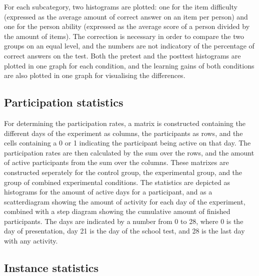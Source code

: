 For each subcategory, two histograms are plotted: one for the item difficulty (expressed as the average amount of correct answer on an item per person) and one for the person ability (expressed as the average score of a person divided by the amount of items). The correction is necessary in order to compare the two groups on an equal level, and the numbers are not indicatory of the percentage of correct answers on the test. Both the pretest and the posttest histograms are plotted in one graph for each condition, and the learning gains of both conditions are also plotted in one graph for visualising the differences.

\subsection{Participation statistics}

For determining the participation rates, a matrix is constructed containing the different days of the experiment as columns, the participants as rows, and the cells containing a 0 or 1 indicating the participant being active on that day. The participation rates are then calculated by the sum over the rows, and the amount of active participants from the sum over the columns. These matrixes are constructed seperately for the control group, the experimental group, and the group of combined experimental conditions. The statistics are depicted as histograms for the amount of active days for a participant, and as a scatterdiagram showing the amount of activity for each day of the experiment, combined with a step diagram showing the cumulative amount of finished participants. The days are indicated by a number from 0 to 28, where 0 is the day of presentation, day 21 is the day of the school test, and 28 is the last day with any activity.

\subsection{Instance statistics}

